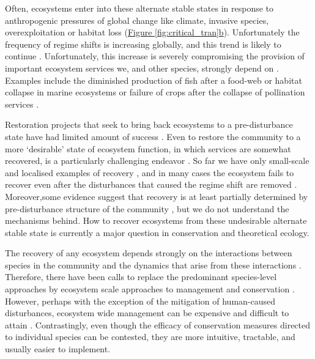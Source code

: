\documentclass[a4paper]{article}
\begin{document}
Often, ecosystems enter into these alternate stable states in response to anthropogenic pressures of global change like climate, invasive species, overexploitation or habitat loss (\hyperref[fig:critical_tran]{Figure \ref{fig:critical_tran}b}).
Unfortunately the frequency of regime shifts is increasing globally, and this trend is likely to continue \autocite{Hughes2005}.
Unfortunately, this increase is severely compromising the provision of important ecosystem services we, and other species, strongly depend on \autocite{Hughes2013a}.
Examples include the diminished production of fish after a food-web or habitat collapse in marine ecosystems \autocite{Hare2000, Daskalov2007, MacNeil2015} or failure of crops after the collapse of pollination services \autocite{Pauw2007,Lever2014}.

Restoration projects that seek to bring back ecosystems to a pre-disturbance state have had limited amount of success \autocite{Suding2004}.
Even to restore the community to a more `desirable' state of ecosystem function, in which services are somewhat recovered, is a particularly challenging endeavor \autocite{Graham2013a}.
So far we have only small-scale and localised examples of recovery \autocite{Carpenter2006a, Stockwell2009}, and in many cases the ecosystem fails to recover even after the disturbances that caused the regime shift are removed \autocite{Hughes2005}.
Moreover,some evidence suggest that recovery is at least partially determined by pre-disturbance structure of the community \autocite{Graham2015}, but we do not understand the mechanisms behind.
How to recover ecosystems from these undesirable alternate stable state is currently a major question in conservation and theoretical ecology.

The recovery of any ecosystem depends strongly on the interactions between species in the community and the dynamics that arise from these interactions \autocite{VandeKoppel1997, Suding2004}.
Therefore, there have been calls to replace the predominant species-level approaches by ecosystem scale approaches to management and conservation \autocite{Suding2009}.
However, perhaps with the exception of the mitigation of human-caused disturbances, ecosystem wide management can be expensive and difficult to attain \autocite{Browman2004, Suding2004}.
Contrastingly, even though the efficacy of conservation measures directed to individual species can be contested, they are more intuitive, tractable, and usually easier to implement.
\end{document}
